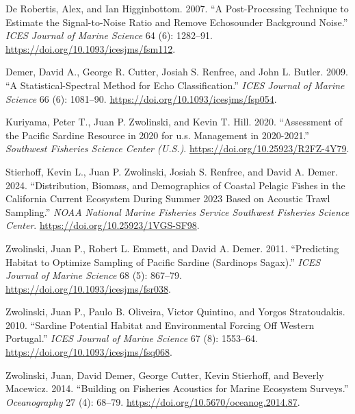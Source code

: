 \documentclass[
  letterpaper,
  oneside,
  open=any]{scrbook}
\newlength{\cslhangindent}
\newenvironment{CSLReferences}[2] %
 {\begin{list}{}{%
  \setlength{\itemindent}{0pt}
  \setlength{\leftmargin}{0pt}
  \setlength{\parsep}{0pt}
  \ifodd #1
   \setlength{\leftmargin}{\cslhangindent}
   \setlength{\itemindent}{-1\cslhangindent}
  \fi
  \setlength{\itemsep}{#2\baselineskip}}}
 {\end{list}}
\begin{document}
\label{refs}
\begin{CSLReferences}{1}{0}
De Robertis, Alex, and Ian Higginbottom. 2007. {``A Post-Processing
Technique to Estimate the Signal-to-Noise Ratio and Remove Echosounder
Background Noise.''} \emph{ICES Journal of Marine Science} 64 (6):
1282--91. \url{https://doi.org/10.1093/icesjms/fsm112}.

Demer, David A., George R. Cutter, Josiah S. Renfree, and John L.
Butler. 2009. {``A Statistical-Spectral Method for Echo
Classification.''} \emph{ICES Journal of Marine Science} 66 (6):
1081--90. \url{https://doi.org/10.1093/icesjms/fsp054}.

Kuriyama, Peter T., Juan P. Zwolinski, and Kevin T. Hill. 2020.
{``Assessment of the Pacific Sardine Resource in 2020 for u.s.
Management in 2020-2021.''} \emph{Southwest Fisheries Science Center
(U.S.)}. \url{https://doi.org/10.25923/R2FZ-4Y79}.

Stierhoff, Kevin L., Juan P. Zwolinski, Josiah S. Renfree, and David A.
Demer. 2024. {``Distribution, Biomass, and Demographics of Coastal
Pelagic Fishes in the California Current Ecosystem During Summer 2023
Based on Acoustic Trawl Sampling.''} \emph{NOAA National Marine
Fisheries Service Southwest Fisheries Science Center}.
\url{https://doi.org/10.25923/1VGS-SF98}.

Zwolinski, Juan P., Robert L. Emmett, and David A. Demer. 2011.
{``Predicting Habitat to Optimize Sampling of Pacific Sardine (Sardinops
Sagax).''} \emph{ICES Journal of Marine Science} 68 (5): 867--79.
\url{https://doi.org/10.1093/icesjms/fsr038}.

Zwolinski, Juan P., Paulo B. Oliveira, Victor Quintino, and Yorgos
Stratoudakis. 2010. {``Sardine Potential Habitat and Environmental
Forcing Off Western Portugal.''} \emph{ICES Journal of Marine Science}
67 (8): 1553--64. \url{https://doi.org/10.1093/icesjms/fsq068}.

Zwolinski, Juan, David Demer, George Cutter, Kevin Stierhoff, and
Beverly Macewicz. 2014. {``Building on Fisheries Acoustics for Marine
Ecosystem Surveys.''} \emph{Oceanography} 27 (4): 68--79.
\url{https://doi.org/10.5670/oceanog.2014.87}.

\end{CSLReferences}


\backmatter
\end{document}
